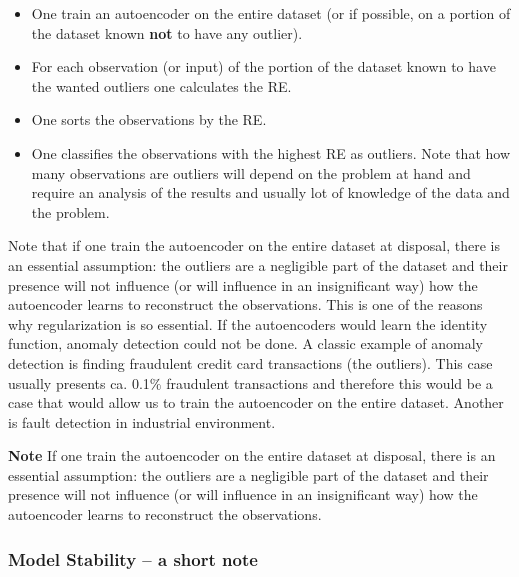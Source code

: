 \documentclass[12pt,a4]{article}
\newenvironment{note}
{\begin{mdframed}[backgroundcolor=light-gray, roundcorner=10pt,leftmargin=1, rightmargin=1, innerleftmargin=15, innertopmargin=15,innerbottommargin=15, outerlinewidth=1, linecolor=light-gray]}
{\end{mdframed}}
\begin{document}
\begin{itemize}
\item One train an autoencoder on the entire dataset (or if possible, on a portion of the dataset known \textbf{not} to have any outlier).
\item
For each observation (or input) of the portion of the dataset known to have the wanted outliers one calculates the RE.
\item
One sorts the observations by the RE.
\item
One classifies the observations with the highest RE as outliers. Note that how many observations are outliers will depend on the problem at hand and require an analysis of the results and usually lot of knowledge of the data and the problem.
\end{itemize}
Note that if one train the autoencoder on the entire dataset at disposal, there is an essential assumption: the outliers are a negligible part of the dataset and their presence will not influence (or will influence in an insignificant way) how the autoencoder learns to reconstruct the observations. This is one of the reasons why regularization is so essential. If the autoencoders would learn the identity function, anomaly detection could not be done.
A classic example of anomaly detection is finding fraudulent credit card transactions (the outliers). This case usually presents ca. 0.1$\%$ fraudulent transactions and therefore this would be a case that would allow us to train the autoencoder on the entire dataset. Another is fault detection in industrial environment.
\begin{note}
\textbf{Note} If one train the autoencoder on the entire dataset at disposal, there is an essential assumption: the outliers are a negligible part of the dataset and their presence will not influence (or will influence in an insignificant way) how the autoencoder learns to reconstruct the observations.
\end{note}
\subsubsection{Model Stability – a short note}
\end{document}
